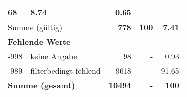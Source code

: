 \begin{longtable}{lXrrr}
       \num{68} &
       \num[round-mode=places,round-precision=2]{8.74} &
         \num[round-mode=places,round-precision=2]{0.65} \\
     \midrule
     \multicolumn{2}{l}{Summe (gültig)} &
       \textbf{\num{778}} &
     \textbf{\num{100}} &
       \textbf{\num[round-mode=places,round-precision=2]{7.41}} \\
     \multicolumn{5}{l}{\textbf{Fehlende Werte}}\\
       -998 &
       keine Angabe &
         \num{98} &
        - &
         \num[round-mode=places,round-precision=2]{0.93} \\
       -989 &
       filterbedingt fehlend &
         \num{9618} &
        - &
         \num[round-mode=places,round-precision=2]{91.65} \\
     \midrule
     \multicolumn{2}{l}{\textbf{Summe (gesamt)}} &
          \textbf{\num{10494}} &
        \textbf{-} &
        \textbf{\num{100}} \\
     \bottomrule
     \end{longtable}
     
